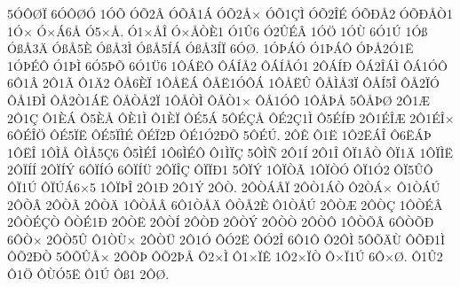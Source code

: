 {5^^d3^^d4^^d8^^cf
6^^d3^^d4^^d8^^d3
1^^d3^^d5
^^d3^^d52^^c2
^^d3^^d5^^c21^^c1
^^d3^^d52^^c5^^d7
^^d3^^d51^^c7^^cc
^^d3^^d52^^ce^^c9
^^d3^^d5^^d0^^c52
^^d3^^d5^^d0^^c5^^d21
1^^d3^^d7
^^d3^^d7^^c16^^c5
^^d35^^d7^^c5.
^^d31^^d7^^c5^^ce
^^d3^^d7^^c5^^d2^^c81
^^d31^^db6
^^d32^^db^^c9^^c2
1^^d3^^d6
1^^d3^^d9
6^^d31^^da
1^^d3^^df
^^d3^^df^^c53^^c4
^^d3^^df^^c55^^c8
^^d3^^df^^c53^^cc
^^d3^^df^^c55^^cd^^c1
^^d3^^df^^c53^^cd^^cf
6^^d3^^d8.
1^^d3^^de^^c1^^d3
^^d31^^de^^c1^^d4
^^d3^^de^^c52^^d31^^cb
1^^d3^^de^^c9^^d4
^^d31^^de^^cc
6^^d35^^de^^d5
6^^d31^^dc6
1^^d4^^c1^^cb^^d4
^^d4^^c1^^cd^^c52
^^d4^^c1^^cd^^c5^^d31
2^^d4^^c1^^cd^^d0
^^d4^^c12^^ce^^c1^^cc
^^d4^^c11^^d3^^d4
6^^d41^^c2
2^^d41^^c3
^^d41^^c42
^^d4^^c56^^c8^^cf
1^^d4^^c5^^cb^^c1
^^d4^^c5^^cb1^^d3^^d4^^c1
1^^d4^^c5^^cb^^db
^^d4^^c5^^cc^^c53^^cf
^^d4^^c5^^cd5^^ce
^^d4^^c52^^cf^^d3
^^d4^^c51^^d0^^cc
^^d4^^c52^^d21^^c1^^cb
^^d4^^c5^^d2^^c52^^cf
1^^d4^^c5^^d2^^cc
^^d4^^c5^^d21^^d7
^^d4^^c51^^d3^^d4
1^^d4^^c5^^de^^c5
5^^d4^^c5^^de^^d8
2^^d41^^c6
2^^d41^^c7
^^d41^^c8^^c1
^^d45^^c8^^c5
^^d4^^c81^^cc
^^d41^^c8^^cf
^^d4^^c95^^c1
5^^d4^^c9^^c7^^c5
^^d4^^c92^^c71^^cc
^^d45^^c9^^cd^^d0
2^^d41^^c9^^ce^^c6
2^^d41^^c9^^ce^^d7
6^^d4^^c9^^ce^^d6
^^d4^^c95^^cf^^cb
^^d4^^c95^^cf^^cc^^c9
^^d4^^c9^^cf2^^d0
^^d4^^c91^^d32^^d0^^d5
5^^d4^^c9^^da.
2^^d4^^ca
^^d41^^cb
1^^d42^^cb^^c1^^ce
^^d46^^cb^^c1^^de
1^^d4^^cb^^ce
1^^d4^^cc^^c5
^^d4^^cc^^c55^^c76
^^d45^^cc^^c9^^ce
1^^d46^^cc^^c9^^d4
^^d41^^cc^^cf^^c7
5^^d4^^cc^^d1
2^^d41^^cd
2^^d41^^ce
^^d4^^cf1^^c2^^d2
^^d4^^cf1^^c4
1^^d4^^cf^^cc^^cb
2^^d4^^cf^^cd^^cd
2^^d4^^cf^^cd^^dd
6^^d4^^cf^^cd^^d3
6^^d4^^cf^^cd^^dc
2^^d4^^cf^^ce^^c7
^^d4^^cf^^cf^^d01
5^^d4^^cf^^dd
1^^d4^^cf^^d2^^c3
1^^d4^^cf^^d2^^d3
^^d4^^cf1^^d32
^^d4^^cf5^^db^^d4
^^d4^^cf1^^da
^^d4^^cf^^da^^c16^^d75
1^^d4^^cf^^de^^ce
2^^d41^^d0
2^^d41^^dd
2^^d4^^d2.
2^^d4^^d2^^c1^^c2^^cf
2^^d4^^d21^^c1^^d2
^^d42^^d2^^c1^^d7
^^d41^^d2^^c1^^da
2^^d4^^d2^^c2
2^^d4^^d2^^c3
2^^d4^^d2^^c4
1^^d4^^d2^^c5^^c2
6^^d41^^d2^^c5^^c4
^^d4^^d2^^c52^^c8
^^d41^^d2^^c5^^da
2^^d4^^d2^^c6
2^^d4^^d2^^c7
1^^d4^^d2^^c9^^c2
2^^d4^^d2^^c9^^c7^^d2
^^d4^^d2^^c91^^d0
2^^d4^^d2^^cb
2^^d4^^d2^^cd
2^^d4^^d2^^d0
2^^d4^^d2^^dd
2^^d4^^d2^^d2
2^^d4^^d2^^d4
1^^d4^^d2^^d5^^c2
6^^d4^^d2^^d5^^d0
6^^d4^^d2^^d7
2^^d4^^d25^^db
^^d41^^d2^^d9^^d7
2^^d4^^d2^^dc
2^^d41^^d3
^^d4^^d32^^cb
^^d4^^d32^^ce
6^^d41^^d4
^^d42^^d4^^cc
5^^d4^^d5^^c4^^d9
^^d4^^d5^^d01^^cc
^^d4^^d52^^d0^^d2
5^^d4^^d5^^db^^c5^^d7
2^^d4^^d5^^de
^^d4^^d52^^de^^c5
^^d42^^d7^^cc
^^d41^^d7^^cf^^ca
1^^d42^^d7^^cf^^d2
^^d4^^d7^^cf1^^da
6^^d4^^d7^^d8.
^^d41^^db2
^^d41^^d6
^^d4^^d9^^d35^^cb
^^d41^^da
^^d4^^df1
2^^d4^^d8.
}
